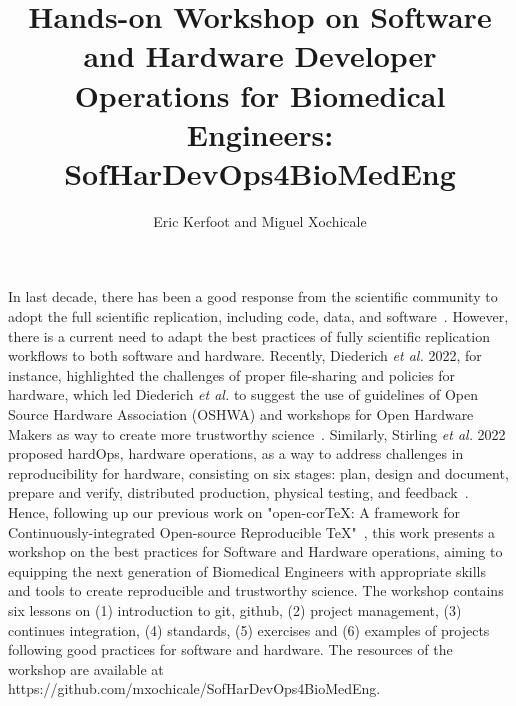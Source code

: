 \documentclass{article}
\title{
Hands-on Workshop on Software and Hardware Developer Operations for Biomedical Engineers: SofHarDevOps4BioMedEng %
}
\author{
Eric Kerfoot and Miguel Xochicale
}
\date{\DTMNow}
\begin{document}
\maketitle
In last decade, there has been a good response from the scientific community to adopt the full scientific replication, including code, data, and software~\cite{peng2011}. 
However, there is a current need to adapt the best practices of fully scientific replication workflows to both software and hardware.
Recently, Diederich \textit{et al.} 2022, for instance, highlighted the challenges of proper file-sharing and policies for hardware, which led Diederich \textit{et al.} to suggest the use of guidelines of Open Source Hardware Association (OSHWA) and workshops for Open Hardware Makers as way to create more trustworthy science~\cite{Diederich2022}.
Similarly, Stirling \textit{et al.} 2022 proposed hardOps, hardware operations, as a way to address challenges in reproducibility for hardware, consisting on six stages: plan, design and document, prepare and verify, distributed production, physical testing, and feedback~\cite{stirling2022}. 
Hence, following up our previous work on "open-corTeX: A framework for Continuously-integrated Open-source Reproducible TeX"~\cite{xochicale2020}, this work presents a workshop on the best practices for Software and Hardware operations, aiming to equipping the next generation of Biomedical Engineers with appropriate skills and tools to create reproducible and trustworthy science.
The workshop contains six lessons on (1) introduction to git, github, (2) project management, (3) continues integration, (4) standards, (5) exercises and (6) examples of projects following good practices for software and hardware.
The resources of the workshop are available at https://github.com/mxochicale/SofHarDevOps4BioMedEng.

\newpage
%

\end{document}
